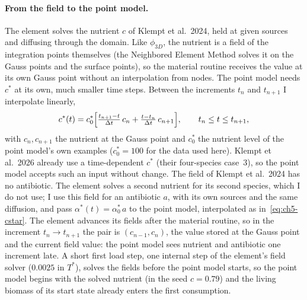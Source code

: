 \paragraph{From the field to the point model.}
The element solves the nutrient $c$ of Klempt et al.\ 2024, held at given sources and diffusing through
the domain. Like $\phi_{3D}$, the nutrient is a field of the integration points themselves (the
Neighbored Element Method solves it on the Gauss points and the surface points), so the material
routine receives the value at its own Gauss point without an interpolation from nodes. The point model needs $c^*$ at its own, much smaller time steps.
Between the increments $t_n$ and $t_{n+1}$ I interpolate linearly,
\begin{equation}
c^*(t)=c^*_0\Bigl[\tfrac{t_{n+1}-t}{\Delta t}\,c_n+\tfrac{t-t_n}{\Delta t}\,c_{n+1}\Bigr],
\qquad t_n\le t\le t_{n+1},
\label{eq:ch5-cstar}
\end{equation}
with $c_n,c_{n+1}$ the nutrient at the Gauss point and $c^*_0$ the nutrient level of the point model's
own examples ($c^*_0=100$ for the data used here). Klempt et al.\ 2026 already use a time-dependent $c^*$ (their four-species case~3), so
the point model accepts such an input without change. The field of Klempt et al.\ 2024 has no
antibiotic. The element solves a second nutrient for its second species, which I do not use; I use this
field for an antibiotic $a$, with its own sources and the same diffusion, and pass
$\alpha^*(t)=\alpha^*_0\,a$ to the point model, interpolated as in~\eqref{eq:ch5-cstar}. The
element advances its fields after the material routine, so in the increment $t_n\to t_{n+1}$ the pair
is $(c_{n-1},c_n)$, the value stored at the Gauss point and the current field value: the point model
sees nutrient and antibiotic one increment late. A short first load step, one internal step of the element's field solver
($0.0025$ in $T^*$), solves the fields before the point model starts, so the point model begins with the
solved nutrient (in the seed $c=0.79$) and the living biomass of its start state already enters the
first consumption.

